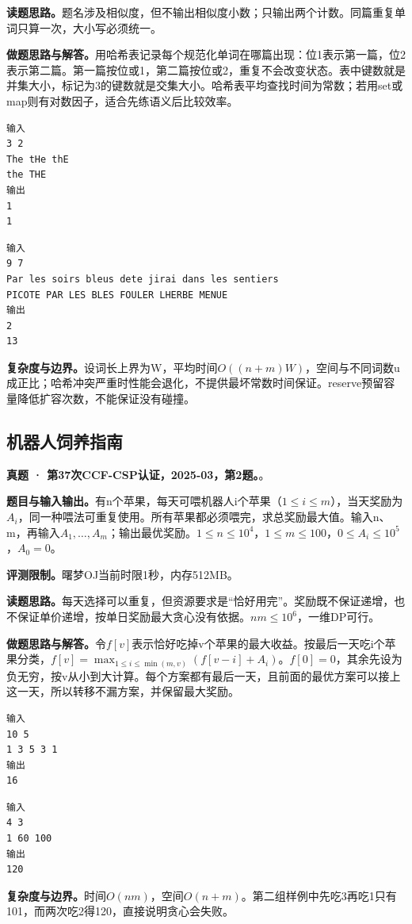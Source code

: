 \noindent\textbf{读题思路。}题名涉及相似度，但不输出相似度小数；只输出两个计数。同篇重复单词只算一次，大小写必须统一。

\noindent\textbf{做题思路与解答。}用哈希表记录每个规范化单词在哪篇出现：位1表示第一篇，位2表示第二篇。第一篇按位或1，第二篇按位或2，重复不会改变状态。表中键数就是并集大小，标记为3的键数就是交集大小。哈希表平均查找时间为常数；若用set或map则有对数因子，适合先练语义后比较效率。
\begin{verbatim}
输入
3 2
The tHe thE
the THE
输出
1
1
\end{verbatim}
\begin{verbatim}
输入
9 7
Par les soirs bleus dete jirai dans les sentiers
PICOTE PAR LES BLES FOULER LHERBE MENUE
输出
2
13
\end{verbatim}

\noindent\textbf{复杂度与边界。}设词长上界为W，平均时间$O((n+m)W)$，空间与不同词数u成正比；哈希冲突严重时性能会退化，不提供最坏常数时间保证。reserve预留容量降低扩容次数，不能保证没有碰撞。
\subsection{机器人饲养指南}
\textbf{真题 · 第37次CCF-CSP认证，2025-03，第2题。}。

\noindent\textbf{题目与输入输出。}有n个苹果，每天可喂机器人i个苹果（$1\le i\le m$），当天奖励为$A_i$，同一种喂法可重复使用。所有苹果都必须喂完，求总奖励最大值。输入n、m，再输入$A_1,\ldots,A_m$；输出最优奖励。$1\le n\le10^4$，$1\le m\le100$，$0\le A_i\le10^5$，$A_0=0$。

\noindent\textbf{评测限制。}曙梦OJ当前时限1秒，内存512MB。

\noindent\textbf{读题思路。}每天选择可以重复，但资源要求是“恰好用完”。奖励既不保证递增，也不保证单价递增，按单日奖励最大贪心没有依据。$nm\le10^6$，一维DP可行。

\noindent\textbf{做题思路与解答。}令$f[v]$表示恰好吃掉v个苹果的最大收益。按最后一天吃i个苹果分类，$f[v]=\max_{1\le i\le\min(m,v)}(f[v-i]+A_i)$。$f[0]=0$，其余先设为负无穷，按v从小到大计算。每个方案都有最后一天，且前面的最优方案可以接上这一天，所以转移不漏方案，并保留最大奖励。
\begin{verbatim}
输入
10 5
1 3 5 3 1
输出
16
\end{verbatim}
\begin{verbatim}
输入
4 3
1 60 100
输出
120
\end{verbatim}

\noindent\textbf{复杂度与边界。}时间$O(nm)$，空间$O(n+m)$。第二组样例中先吃3再吃1只有101，而两次吃2得120，直接说明贪心会失败。
